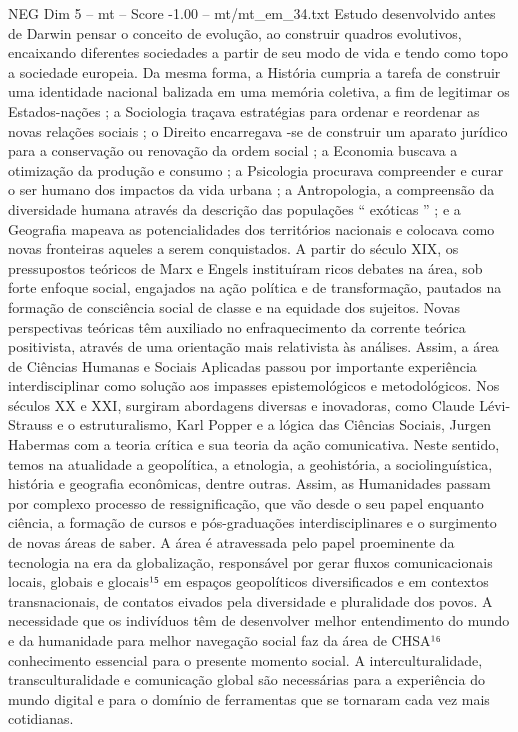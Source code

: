 \begin{textsample}{NEG Dim 5 – mt – Score -1.00 – mt/mt\_em\_34.txt}
Estudo desenvolvido antes de Darwin pensar o conceito de evolução, ao construir quadros evolutivos, encaixando diferentes sociedades a partir de seu modo de vida e tendo como topo a sociedade europeia.
Da mesma forma, a História cumpria a tarefa de construir uma identidade nacional balizada em uma memória coletiva, a fim de legitimar os Estados-nações ; a Sociologia traçava estratégias para ordenar e reordenar as novas relações sociais ; o Direito encarregava -se de construir um aparato jurídico para a conservação ou renovação da ordem social ; a Economia buscava a otimização da produção e consumo ; a Psicologia procurava compreender e curar o ser humano dos impactos da vida urbana ; a Antropologia, a compreensão da diversidade humana através da descrição das populações “ exóticas ” ; e a Geografia mapeava as potencialidades dos territórios nacionais e colocava como novas fronteiras aqueles a serem conquistados.
A partir do século XIX, os pressupostos teóricos de Marx e Engels instituíram ricos debates na área, sob forte enfoque social, engajados na ação política e de transformação, pautados na formação de consciência social de classe e na equidade dos sujeitos.
Novas perspectivas teóricas têm auxiliado no enfraquecimento da corrente teórica positivista, através de uma orientação mais relativista às análises.
Assim, a área de Ciências Humanas e Sociais Aplicadas passou por importante experiência interdisciplinar como solução aos impasses epistemológicos e metodológicos.
Nos séculos XX e XXI, surgiram abordagens diversas e inovadoras, como Claude Lévi-Strauss e o estruturalismo, Karl Popper e a lógica das Ciências Sociais, Jurgen Habermas com a teoria crítica e sua teoria da ação comunicativa.
Neste sentido, temos na atualidade a geopolítica, a etnologia, a geohistória, a sociolinguística, história e geografia econômicas, dentre outras.
Assim, as Humanidades passam por complexo processo de ressignificação, que vão desde o seu papel enquanto ciência, a formação de cursos e pós-graduações interdisciplinares e o surgimento de novas áreas de saber.
A área é atravessada pelo papel proeminente da tecnologia na era da globalização, responsável por gerar fluxos comunicacionais locais, globais e glocais¹⁵ em espaços geopolíticos diversificados e em contextos transnacionais, de contatos eivados pela diversidade e pluralidade dos povos.
A necessidade que os indivíduos têm de desenvolver melhor entendimento do mundo e da humanidade para melhor navegação social faz da área de CHSA¹⁶ conhecimento essencial para o presente momento social.
A interculturalidade, transculturalidade e comunicação global são necessárias para a experiência do mundo digital e para o domínio de ferramentas que se tornaram cada vez mais cotidianas.

\end{textsample}
